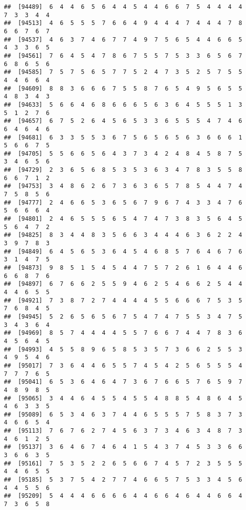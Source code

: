 \documentclass[
]{book}
\begin{document}
\begin{verbatim}
##  [94489]  6  4  4  6  5  6  4  4  5  4  4  6  6  7  5  4  4  4  4  7  3  3  4  4
##  [94513]  4  6  5  5  5  7  6  6  4  9  4  4  4  7  4  4  4  7  8  6  6  7  6  7
##  [94537]  4  6  3  7  4  6  7  7  4  9  7  5  6  5  4  4  6  6  5  4  3  3  6  5
##  [94561]  7  6  4  5  4  7  8  6  7  5  5  7  5  3  3  6  5  6  7  6  8  6  5  6
##  [94585]  7  5  7  5  6  5  7  7  5  2  4  7  3  5  2  5  7  5  5  4  4  6  6  4
##  [94609]  8  8  3  6  6  6  7  5  5  8  7  6  5  4  9  5  6  5  5  4  8  3  4  3
##  [94633]  5  6  6  4  6  8  6  6  6  5  6  3  6  4  5  5  5  1  3  5  1  2  7  6
##  [94657]  6  7  5  2  6  4  5  6  5  3  3  6  5  5  5  4  7  4  6  6  4  6  4  6
##  [94681]  6  3  3  5  5  3  6  7  5  6  5  6  5  6  3  6  6  6  1  5  6  6  7  5
##  [94705]  5  5  6  6  5  6  4  3  7  3  4  2  4  8  4  5  8  7  5  3  4  6  5  6
##  [94729]  2  3  6  5  6  8  5  3  5  3  6  3  4  7  8  3  5  5  8  6  6  7  1  2
##  [94753]  3  4  8  6  2  6  7  3  6  3  6  5  7  8  5  4  4  7  4  7  5  8  5  6
##  [94777]  2  4  6  6  5  3  6  5  6  7  9  6  7  4  3  3  4  7  6  5  6  6  6  4
##  [94801]  2  4  6  5  5  5  6  5  4  7  4  7  3  8  3  5  6  4  5  5  6  4  7  2
##  [94825]  8  3  4  4  8  3  5  6  6  3  4  4  4  6  3  6  2  2  4  3  9  7  8  3
##  [94849]  6  4  5  6  5  3  6  4  5  4  6  8  5  7  6  4  6  7  6  3  1  4  7  5
##  [94873]  9  8  5  1  5  4  5  4  4  7  5  7  2  6  1  6  4  4  6  6  6  8  7  6
##  [94897]  6  7  6  6  2  5  5  9  4  6  2  5  4  6  6  2  5  4  4  4  4  6  5  5
##  [94921]  7  3  8  7  2  7  4  4  4  4  5  5  6  6  6  7  5  3  5  7  6  8  4  5
##  [94945]  5  2  6  5  6  5  6  7  5  4  7  4  7  5  5  3  4  7  5  3  4  3  6  4
##  [94969]  8  5  7  4  4  4  4  5  5  7  6  6  7  4  4  7  8  3  6  4  5  6  4  5
##  [94993]  4  5  5  8  9  6  5  8  5  3  5  7  3  6  6  2  5  5  3  4  9  5  4  6
##  [95017]  7  3  6  4  4  6  5  5  7  4  5  4  2  5  6  5  5  5  4  7  7  7  6  5
##  [95041]  6  5  3  6  4  6  4  7  3  6  7  6  6  5  7  6  5  9  7  4  8  9  8  5
##  [95065]  3  4  4  6  4  5  5  4  5  5  4  8  8  5  4  8  6  4  5  4  6  3  3  5
##  [95089]  6  5  3  4  6  3  7  4  4  6  5  5  5  7  5  8  3  7  3  4  6  6  5  4
##  [95113]  7  6  7  6  2  7  4  5  6  3  7  3  4  6  3  4  8  7  3  4  6  1  2  5
##  [95137]  3  6  4  6  7  4  6  4  1  5  4  3  7  4  5  3  3  6  6  3  6  6  3  5
##  [95161]  7  5  3  5  2  2  6  5  6  6  7  4  5  7  2  3  5  5  5  4  4  6  5  5
##  [95185]  5  3  7  5  4  2  7  7  4  6  6  5  7  5  3  3  4  5  6  4  4  5  5  6
##  [95209]  5  4  4  4  6  6  6  6  4  4  6  6  4  6  4  4  6  6  4  7  3  6  5  8

\end{verbatim}
\end{document}
